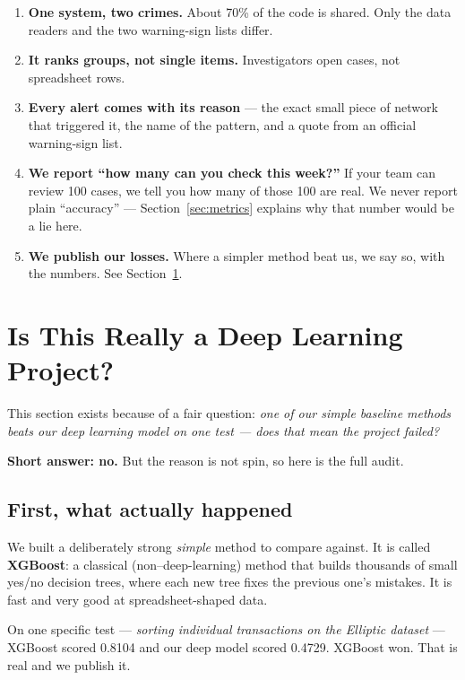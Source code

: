 \documentclass[11pt,a4paper]{article}
\begin{document}
\begin{enumerate}
  \item \textbf{One system, two crimes.} About 70\% of the code is shared. Only
        the data readers and the two warning-sign lists differ.
  \item \textbf{It ranks groups, not single items.} Investigators open cases, not
        spreadsheet rows.
  \item \textbf{Every alert comes with its reason} --- the exact small piece of
        network that triggered it, the name of the pattern, and a quote from an
        official warning-sign list.
  \item \textbf{We report ``how many can you check this week?''} If your team can
        review 100 cases, we tell you how many of those 100 are real. We never
        report plain ``accuracy'' --- Section~\ref{sec:metrics} explains why that
        number would be a lie here.
  \item \textbf{We publish our losses.} Where a simpler method beat us, we say
        so, with the numbers. See Section~\ref{sec:isitdl}.
\end{enumerate}

\section{Is This Really a Deep Learning Project?}
\label{sec:isitdl}

This section exists because of a fair question: \emph{one of our simple
baseline methods beats our deep learning model on one test --- does that mean the
project failed?}

\textbf{Short answer: no.} But the reason is not spin, so here is the full
audit.

\subsection{First, what actually happened}

We built a deliberately strong \emph{simple} method to compare against. It is
called \textbf{XGBoost}: a classical (non--deep-learning) method that builds
thousands of small yes/no decision trees, where each new tree fixes the previous
one's mistakes. It is fast and very good at spreadsheet-shaped data.

On one specific test --- \emph{sorting individual transactions on the Elliptic
dataset} --- XGBoost scored 0.8104 and our deep model scored 0.4729. XGBoost won.
That is real and we publish it.
\end{document}
